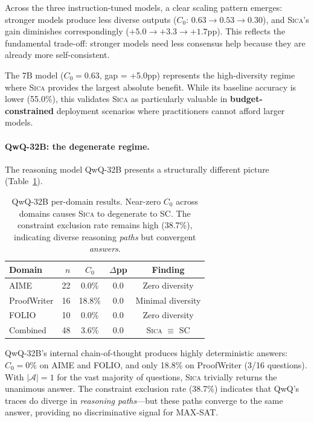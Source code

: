 \documentclass[11pt,a4paper]{article}
\newcommand{\sica}{\textsc{Sica}}
\begin{document}
Across the three instruction-tuned models, a clear scaling pattern emerges: stronger models produce less diverse outputs ($C_0$: $0.63 \to 0.53 \to 0.30$), and \sica{}'s gain diminishes correspondingly ($+5.0 \to +3.3 \to +1.7$pp).
This reflects the fundamental trade-off: stronger models need less consensus help because they are already more self-consistent.

The 7B model ($C_0 = 0.63$, gap = +5.0pp) represents the high-diversity regime where \sica{} provides the largest absolute benefit.
While its baseline accuracy is lower (55.0\%), this validates \sica{} as particularly valuable in \textbf{budget-constrained} deployment scenarios where practitioners cannot afford larger models.

\paragraph{QwQ-32B: the degenerate regime.}
The reasoning model QwQ-32B presents a structurally different picture (Table~\ref{tab:qwq}).

\begin{table}[t]
\centering
\small
\begin{tabular}{lrccc}
\toprule
\textbf{Domain} & $n$ & $C_0$ & $\Delta$\textbf{pp} & \textbf{Finding} \\
\midrule
AIME & 22 & 0.0\% & 0.0 & Zero diversity \\
ProofWriter & 16 & 18.8\% & 0.0 & Minimal diversity \\
FOLIO & 10 & 0.0\% & 0.0 & Zero diversity \\
\midrule
Combined & 48 & 3.6\% & 0.0 & \sica{} $\equiv$ SC \\
\bottomrule
\end{tabular}
\caption{QwQ-32B per-domain results. Near-zero $C_0$ across domains causes \sica{} to degenerate to SC. The constraint exclusion rate remains high (38.7\%), indicating diverse reasoning \emph{paths} but convergent \emph{answers}.}
\label{tab:qwq}
\end{table}

QwQ-32B's internal chain-of-thought produces highly deterministic answers: $C_0 = 0\%$ on AIME and FOLIO, and only 18.8\% on ProofWriter (3/16 questions).
With $|\mathcal{A}| = 1$ for the vast majority of questions, \sica{} trivially returns the unanimous answer.
The constraint exclusion rate (38.7\%) indicates that QwQ's traces do diverge in \emph{reasoning paths}---but these paths converge to the same answer, providing no discriminative signal for MAX-SAT.
\end{document}
